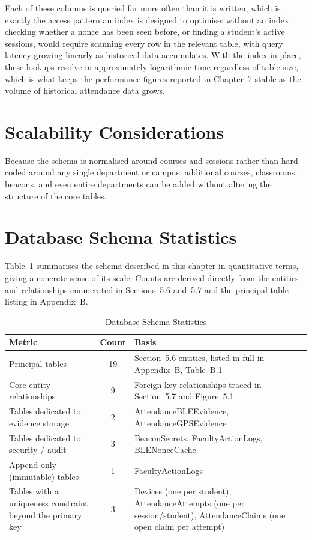 \documentclass[12pt, a4paper, oneside]{report}
\begin{document}
Each of these columns is queried far more often than it is written, which is exactly the access pattern an index is designed to optimise: without an index, checking whether a nonce has been seen before, or finding a student's active sessions, would require scanning every row in the relevant table, with query latency growing linearly as historical data accumulates. With the index in place, these lookups resolve in approximately logarithmic time regardless of table size, which is what keeps the performance figures reported in Chapter~7 stable as the volume of historical attendance data grows.

\section{Scalability Considerations}

Because the schema is normalised around courses and sessions rather than hard-coded around any single department or campus, additional courses, classrooms, beacons, and even entire departments can be added without altering the structure of the core tables.

\section{Database Schema Statistics}

Table~\ref{tab:schema-stats} summarises the schema described in this chapter in quantitative terms, giving a concrete sense of its scale. Counts are derived directly from the entities and relationships enumerated in Sections~5.6 and~5.7 and the principal-table listing in Appendix~B.

\begin{table}[htbp]
\centering
\caption{Database Schema Statistics}
\label{tab:schema-stats}
\begin{tabularx}{\textwidth}{|X|c|X|}
\hline
\textbf{Metric} & \textbf{Count} & \textbf{Basis} \\
\hline
Principal tables & 19 & Section~5.6 entities, listed in full in Appendix~B, Table~B.1 \\
\hline
Core entity relationships & 9 & Foreign-key relationships traced in Section~5.7 and Figure~5.1 \\
\hline
Tables dedicated to evidence storage & 2 & AttendanceBLEEvidence, AttendanceGPSEvidence \\
\hline
Tables dedicated to security / audit & 3 & BeaconSecrets, FacultyActionLogs, BLENonceCache \\
\hline
Append-only (immutable) tables & 1 & FacultyActionLogs \\
\hline
Tables with a uniqueness constraint beyond the primary key & 3 & Devices (one per student), AttendanceAttempts (one per session/student), AttendanceClaims (one open claim per attempt) \\
\hline
\end{tabularx}
\end{table}
\end{document}
